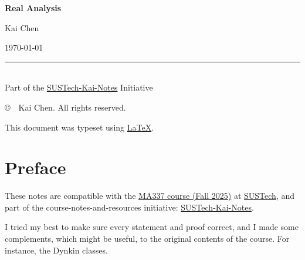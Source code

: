 \documentclass[12pt]{article}
\theoremstyle{blueplain}
\theoremstyle{bluedef}
\theoremstyle{blueremark}
\numberwithin{equation}{section}
\begin{document}

\begin{titlepage}
  \centering
  \vspace*{3cm}

  {\Huge \bfseries Real Analysis \par}

  \vspace{4cm}

  {\Large Kai Chen \par}
  \vspace{0.5cm}
  {\large \today \par}

  \vfill

  \rule{0.8\textwidth}{0.4pt} \\
  \vspace{0.5cm}
  {\small Part of the \href{https://github.com/kaiiiichen/SUSTech-Kai-Notes/wiki}{SUSTech-Kai-Notes} Initiative}
\end{titlepage}

\newpage
\thispagestyle{empty}

\vspace*{\fill}

\begin{center}
  \copyright\ \the\year\ Kai Chen. All rights reserved.

  \vspace{0.5cm}

  \doclicenseThis

  \vspace{1cm}

  This document was typeset using \href{https://www.latex-project.org}{\LaTeX}.
\end{center}
\clearpage


\section*{Preface}
These notes are compatible with the \href{https://github.com/kaiiiichen/SUSTech-Kai-Notes/tree/main/MA337%20Real%20Analysis%20(H)}{MA337 course (Fall 2025)} at \href{https://www.sustech.edu.cn/}{SUSTech}, and part of the course-notes-and-resources initiative: \href{https://github.com/kaiiiichen/SUSTech-Kai-Notes/wiki}{SUSTech-Kai-Notes}.

\medskip

\noindent I tried my best to make sure every statement and proof correct, and I made some complements, which might be useful, to the original contents of the course. For instance, the Dynkin classes.
\end{document}
